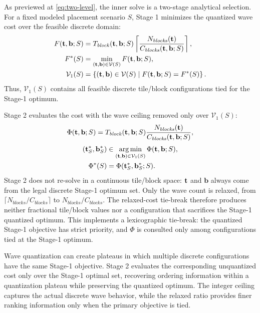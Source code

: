As previewed at \autoref{eq:two-level}, the inner solve is a two-stage analytical selection. For a fixed modeled placement scenario \(S\), Stage 1 minimizes the quantized wave cost over the feasible discrete domain:
\begin{equation}
\begin{aligned}
F(\mathbf{t},\mathbf{b};S)
&=T_{\mathit{block}}(\mathbf{t},\mathbf{b};S)
  \left\lceil
  \frac{N_{\mathit{blocks}}(\mathbf{t})}
       {C_{\mathit{blocks}}(\mathbf{t},\mathbf{b};S)}
  \right\rceil,\\
F^*(S)
&=\min_{(\mathbf{t},\mathbf{b})\in\mathcal{V}(S)}
  F(\mathbf{t},\mathbf{b};S),\\
\mathcal{V}_1(S)
&=\left\{(\mathbf{t},\mathbf{b})\in\mathcal{V}(S)
  \mid F(\mathbf{t},\mathbf{b};S)=F^*(S)\right\}.
\end{aligned}
\label{eq:stage-one}
\end{equation}
Thus, \(\mathcal{V}_1(S)\) contains all feasible discrete tile/block configurations tied for the Stage-1 optimum.

Stage 2 evaluates the cost with the wave ceiling removed only over \(\mathcal{V}_1(S)\):
\begin{equation}
\Phi(\mathbf{t},\mathbf{b};S)
=T_{\mathit{block}}(\mathbf{t},\mathbf{b};S)
 \frac{N_{\mathit{blocks}}(\mathbf{t})}
      {C_{\mathit{blocks}}(\mathbf{t},\mathbf{b};S)},
\label{eq:relaxed-cost}
\end{equation}
\begin{equation}
\begin{aligned}
(\mathbf{t}_S^*,\mathbf{b}_S^*)
&\in \mathop{\arg\min}_{(\mathbf{t},\mathbf{b})\in\mathcal{V}_1(S)}
 \Phi(\mathbf{t},\mathbf{b};S),\\
\Phi^*(S)
&=\Phi(\mathbf{t}_S^*,\mathbf{b}_S^*;S).
\end{aligned}
\label{eq:stage-two}
\end{equation}
Stage 2 does not re-solve in a continuous tile/block space: \(\mathbf{t}\) and \(\mathbf{b}\) always come from the legal discrete Stage-1 optimum set. Only the wave count is relaxed, from \(\lceil N_{\mathit{blocks}}/C_{\mathit{blocks}}\rceil\) to \(N_{\mathit{blocks}}/C_{\mathit{blocks}}\). The relaxed-cost tie-break therefore produces neither fractional tile/block values nor a configuration that sacrifices the Stage-1 quantized optimum. This implements a lexicographic tie-break: the quantized Stage-1 objective has strict priority, and \(\Phi\) is consulted only among configurations tied at the Stage-1 optimum.

Wave quantization can create plateaus in which multiple discrete configurations have the same Stage-1 objective. Stage 2 evaluates the corresponding unquantized cost only over the Stage-1 optimal set, recovering ordering information within a quantization plateau while preserving the quantized optimum. The integer ceiling captures the actual discrete wave behavior, while the relaxed ratio provides finer ranking information only when the primary objective is tied.

